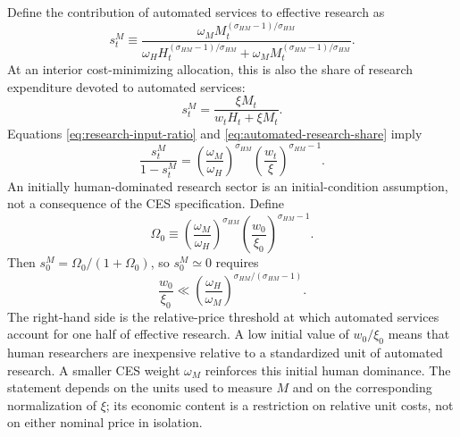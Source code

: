 Define the contribution of automated services to effective research as
\begin{equation}
    s^M_t
    \equiv
    \frac{\omega_M M_t^{(\sigma_{HM}-1)/\sigma_{HM}}}
    {\omega_H H_t^{(\sigma_{HM}-1)/\sigma_{HM}}
        +\omega_M M_t^{(\sigma_{HM}-1)/\sigma_{HM}}}.
    \label{eq:automated-research-share}
\end{equation}
At an interior cost-minimizing allocation, this is also the share of research
expenditure devoted to automated services:
\begin{equation}
    s^M_t=\frac{\xi M_t}{w_tH_t+\xi M_t}.
    \label{eq:automated-research-cost-share}
\end{equation}
Equations \eqref{eq:research-input-ratio} and
\eqref{eq:automated-research-share} imply
\begin{equation}
    \frac{s^M_t}{1-s^M_t}
    =
    \left(\frac{\omega_M}{\omega_H}\right)^{\sigma_{HM}}
    \left(\frac{w_t}{\xi}\right)^{\sigma_{HM}-1}.
    \label{eq:automation-odds}
\end{equation}
An initially human-dominated research sector is an initial-condition assumption,
not a consequence of the CES specification. Define
\begin{equation}
    \Omega_0
    \equiv
    \left(\frac{\omega_M}{\omega_H}\right)^{\sigma_{HM}}
    \left(\frac{w_0}{\xi_0}\right)^{\sigma_{HM}-1}.
    \label{eq:initial-automation-odds}
\end{equation}
Then $s^M_0=\Omega_0/(1+\Omega_0)$, so $s^M_0\simeq0$ requires
\begin{equation}
    \frac{w_0}{\xi_0}
    \ll
    \left(\frac{\omega_H}{\omega_M}\right)^{\sigma_{HM}/(\sigma_{HM}-1)}.
    \label{eq:initial-human-dominance-condition}
\end{equation}
The right-hand side is the relative-price threshold at which automated services
account for one half of effective research. A low initial value of $w_0/\xi_0$
means that human researchers are inexpensive relative to a standardized unit of
automated research. A smaller CES weight $\omega_M$ reinforces this initial human
dominance. The statement depends on the units used to measure $M$ and on the
corresponding normalization of $\xi$; its economic content is a restriction on
relative unit costs, not on either nominal price in isolation.

